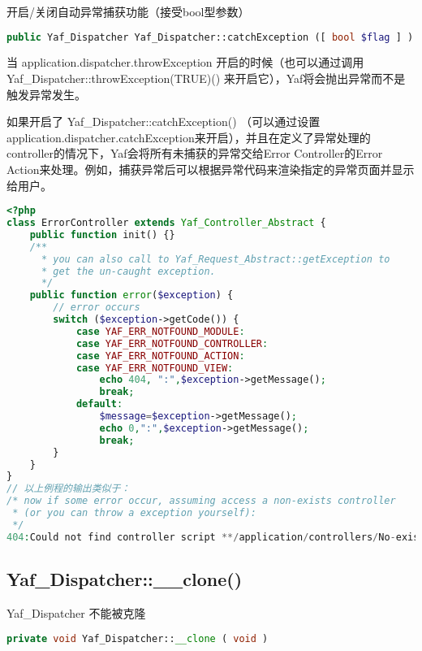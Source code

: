开启/关闭自动异常捕获功能（接受bool型参数）


\begin{lstlisting}[language=PHP]
public Yaf_Dispatcher Yaf_Dispatcher::catchException ([ bool $flag ] )
\end{lstlisting}

当 application.dispatcher.throwException 开启的时候（也可以通过调用 Yaf\_Dispatcher::throwException(TRUE)() 来开启它），Yaf将会抛出异常而不是触发异常发生。

如果开启了 Yaf\_Dispatcher::catchException() （可以通过设置application.dispatcher.catchException来开启），并且在定义了异常处理的controller的情况下，Yaf会将所有未捕获的异常交给Error Controller的Error Action来处理。例如，捕获异常后可以根据异常代码来渲染指定的异常页面并显示给用户。

\begin{lstlisting}[language=PHP]
<?php
class ErrorController extends Yaf_Controller_Abstract {
    public function init() {}
    /** 
      * you can also call to Yaf_Request_Abstract::getException to  
      * get the un-caught exception.
      */
    public function error($exception) {
        // error occurs
        switch ($exception->getCode()) {
            case YAF_ERR_NOTFOUND_MODULE:
            case YAF_ERR_NOTFOUND_CONTROLLER:
            case YAF_ERR_NOTFOUND_ACTION:
            case YAF_ERR_NOTFOUND_VIEW:
                echo 404, ":",$exception->getMessage();
                break;
            default:
                $message=$exception->getMessage();
                echo 0,":",$exception->getMessage();
                break;
        }
    }
}
// 以上例程的输出类似于：
/* now if some error occur, assuming access a non-exists controller
 * (or you can throw a exception yourself): 
 */
404:Could not find controller script **/application/controllers/No-exists-controller.php
\end{lstlisting}



\subsection{Yaf\_Dispatcher::\_\_clone()}

 Yaf\_Dispatcher 不能被克隆


\begin{lstlisting}[language=PHP]
private void Yaf_Dispatcher::__clone ( void )
\end{lstlisting}




